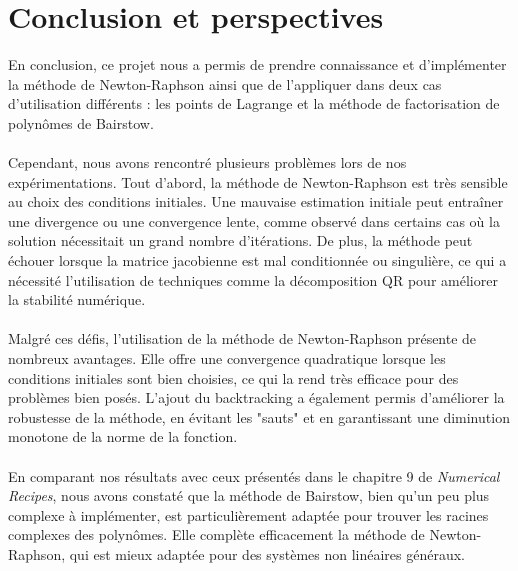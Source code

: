 \documentclass{article}
\begin{document}
\section{Conclusion et perspectives}
En conclusion, ce projet nous a permis de prendre connaissance et d'implémenter la méthode de Newton-Raphson ainsi que de l'appliquer dans deux cas d'utilisation différents : les points de Lagrange et la méthode de factorisation de polynômes de Bairstow. 
\\ \\
Cependant, nous avons rencontré plusieurs problèmes lors de nos expérimentations. Tout d'abord, la méthode de Newton-Raphson est très sensible au choix des conditions initiales. Une mauvaise estimation initiale peut entraîner une divergence ou une convergence lente, comme observé dans certains cas où la solution nécessitait un grand nombre d'itérations. De plus, la méthode peut échouer lorsque la matrice jacobienne est mal conditionnée ou singulière, ce qui a nécessité l'utilisation de techniques comme la décomposition QR pour améliorer la stabilité numérique.
\\ \\
Malgré ces défis, l'utilisation de la méthode de Newton-Raphson présente de nombreux avantages. Elle offre une convergence quadratique lorsque les conditions initiales sont bien choisies, ce qui la rend très efficace pour des problèmes bien posés. L'ajout du backtracking a également permis d'améliorer la robustesse de la méthode, en évitant les "sauts" et en garantissant une diminution monotone de la norme de la fonction.
\\ \\
En comparant nos résultats avec ceux présentés dans le chapitre 9 de \textit{Numerical Recipes}, nous avons constaté que la méthode de Bairstow, bien qu'un peu plus complexe à implémenter, est particulièrement adaptée pour trouver les racines complexes des polynômes. Elle complète efficacement la méthode de Newton-Raphson, qui est mieux adaptée pour des systèmes non linéaires généraux.
\end{document}
